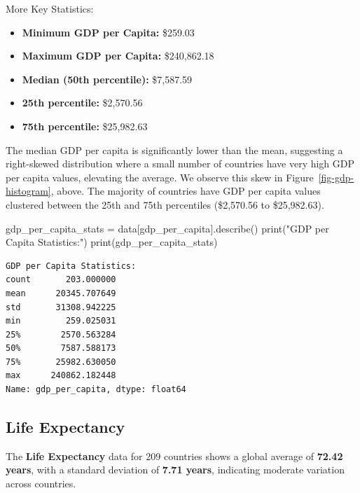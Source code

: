\documentclass[
]{article}
\newenvironment{Shaded}{\begin{snugshade}}{\end{snugshade}}
\newcommand{\BuiltInTok}[1]{\textcolor[rgb]{0.00,0.23,0.31}{#1}}
\newcommand{\NormalTok}[1]{\textcolor[rgb]{0.00,0.23,0.31}{#1}}
\newcommand{\OperatorTok}[1]{\textcolor[rgb]{0.37,0.37,0.37}{#1}}
\newcommand{\StringTok}[1]{\textcolor[rgb]{0.13,0.47,0.30}{#1}}
\providecommand{\tightlist}{%
  \setlength{\itemsep}{0pt}\setlength{\parskip}{0pt}}\usepackage{longtable,booktabs,array}
\begin{document}
More Key Statistics:

\begin{itemize}
\tightlist
\item
  \textbf{Minimum GDP per Capita:} \$259.03
\item
  \textbf{Maximum GDP per Capita:} \$240,862.18
\item
  \textbf{Median (50th percentile):} \$7,587.59
\item
  \textbf{25th percentile:} \$2,570.56
\item
  \textbf{75th percentile:} \$25,982.63
\end{itemize}

The median GDP per capita is significantly lower than the mean,
suggesting a right-skewed distribution where a small number of countries
have very high GDP per capita values, elevating the average. We observe
this skew in Figure~\ref{fig-gdp-histogram}, above. The majority of
countries have GDP per capita values clustered between the 25th and 75th
percentiles (\$2,570.56 to \$25,982.63).

\label{gdp-summary-stats}
\begin{Shaded}
\begin{Highlighting}[]
\NormalTok{gdp\_per\_capita\_stats }\OperatorTok{=}\NormalTok{ data[}\StringTok{\textquotesingle{}gdp\_per\_capita\textquotesingle{}}\NormalTok{].describe()}
\BuiltInTok{print}\NormalTok{(}\StringTok{"GDP per Capita Statistics:"}\NormalTok{)}
\BuiltInTok{print}\NormalTok{(gdp\_per\_capita\_stats)}
\end{Highlighting}
\end{Shaded}

\begin{verbatim}
GDP per Capita Statistics:
count       203.000000
mean      20345.707649
std       31308.942225
min         259.025031
25%        2570.563284
50%        7587.588173
75%       25982.630050
max      240862.182448
Name: gdp_per_capita, dtype: float64
\end{verbatim}

\subsection{Life Expectancy}\label{life-expectancy}

The \textbf{Life Expectancy} data for 209 countries shows a global
average of \textbf{72.42 years}, with a standard deviation of
\textbf{7.71 years}, indicating moderate variation across countries.
\end{document}
